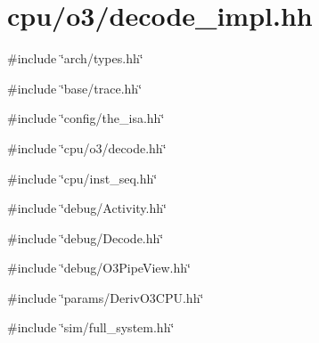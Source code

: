 \hypertarget{decode__impl_8hh}{
\section{cpu/o3/decode\_\-impl.hh}
\label{decode__impl_8hh}
}
{\ttfamily \#include \char`\"{}arch/types.hh\char`\"{}}\par
{\ttfamily \#include \char`\"{}base/trace.hh\char`\"{}}\par
{\ttfamily \#include \char`\"{}config/the\_\-isa.hh\char`\"{}}\par
{\ttfamily \#include \char`\"{}cpu/o3/decode.hh\char`\"{}}\par
{\ttfamily \#include \char`\"{}cpu/inst\_\-seq.hh\char`\"{}}\par
{\ttfamily \#include \char`\"{}debug/Activity.hh\char`\"{}}\par
{\ttfamily \#include \char`\"{}debug/Decode.hh\char`\"{}}\par
{\ttfamily \#include \char`\"{}debug/O3PipeView.hh\char`\"{}}\par
{\ttfamily \#include \char`\"{}params/DerivO3CPU.hh\char`\"{}}\par
{\ttfamily \#include \char`\"{}sim/full\_\-system.hh\char`\"{}}\par
